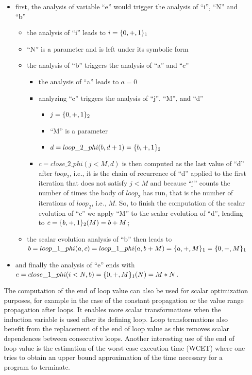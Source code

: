 \begin{itemize}
\item first, the analysis of variable ``e'' would trigger the analysis
  of ``i'', ``N'' and ``b''
  \begin{itemize}
  \item the analysis of ``i'' leads to $i = \{0, +, 1\}_1$
  \item ``N'' is a parameter and is left under its symbolic form
  \item the analysis of ``b'' triggers the analysis of ``a'' and ``c''
    \begin{itemize}
    \item the analysis of ``a'' leads to $a = 0$
    \item analyzing ``c'' triggers the analysis of ``j'', ``M'', and ``d''
      \begin{itemize}
      \item $j = \{0, +, 1\}_2$
      \item ``M'' is a parameter
      \item $d = loop\_2\_phi (b, d + 1) = \{b, +, 1\}_2$
      \end{itemize}
    \item $c = close\_2\_phi (j < M, d)$ is then computed as the last value of ``d'' after
      $loop_2$, i.e., it is the chain of recurrence of ``d'' applied
      to the first iteration that does not satisfy $j < M$ and
      because ``j'' counts the number of times the body of $loop_2$
      has run, that is the number of iterations of $loop_2$, i.e.,
      $M$.  So, to finish the computation of the scalar evolution of
      ``c'' we apply ``M'' to the scalar evolution of ``d'', leading
      to $c = \{b, +, 1\}_2 (M) = b + M$;
    \end{itemize}
  \item the scalar evolution analysis of ``b'' then leads to $b =
    loop\_1\_phi (a, c) = loop\_1\_phi (a, b + M) = \{a, +, M\}_1 =
    \{0, +, M\}_1$
  \end{itemize}
\item and finally the analysis of ``e'' ends with $e = close\_1\_phi (i
  < N, b) = \{0, +, M\}_1 (N) = M * N$.
\end{itemize}

The computation of the end of loop value can also be used for scalar
optimization purposes, for example in the case of the constant
propagation or the value range propagation after loops.  It enables
more scalar transformations when the induction variable is used after
its defining loop.  Loop transformations also benefit from the
replacement of the end of loop value as this removes scalar
dependences between consecutive loops.  Another interesting use of the
end of loop value is the estimation of the worst case execution time
(WCET) where one tries to obtain an upper bound approximation of the
time necessary for a program to terminate.

